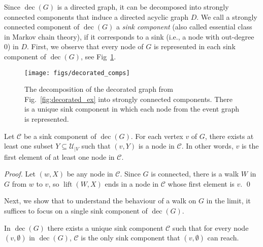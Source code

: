 \documentclass[oribibl,envcountsect,envcountsame]{llncs}
\DeclareMathOperator{\dec}{dec}
\DeclareMathOperator{\lt}{lift}
\newcommand{\C}{\mathcal C}
\newcommand{\U}{\mathcal U}
\begin{document}
Since $\dec(G)$ is a directed graph, it can be decomposed into
strongly connected components that induce a directed acyclic
graph $D$. 
We call a strongly connected component of $\dec(G)$ a \emph{sink 
component} (also called essential class in Markov chain theory), 
if it corresponds to a sink 
(i.e., a node with out-degree $0$) in $D$. 
First, we observe that every node of $G$ is represented in each sink
component of $\dec(G)$, see Fig~\ref{fig:decorated_comps}.

\begin{figure}
\begin{center}
\texttt{[image: figs/decorated\_comps]}
\end{center}
\caption{The decomposition of the decorated graph from 
  Fig.~\ref{fig:decorated_ex} into strongly connected components.
  There is a unique sink component in which each node from the
  event graph is represented.
}
\label{fig:decorated_comps}
\end{figure}


\begin{lemma}\label{lem:all-first-nodes}
Let $\C$ be a sink component of $\dec(G)$.
For each vertex $v$ of $G$, there exists at least one subset $Y \subseteq \U_{|V}$
such that $(v,Y)$ is a node  in $\C$. In other words, $v$ is the first element
of at least one node in $\C$.
\end{lemma}

\begin{proof}
Let $(w, X)$ be any node in $\C$. Since $G$ is connected, 
there is a walk $W$ in $G$ from
$w$ to $v$, so $\lt(W, X)$ ends in a node in $\C$ whose first element is
$v$.
\qed\end{proof}


Next, we show that to understand
the  behaviour of a walk on $G$ in the limit, it
suffices to focus on a single sink component of $\dec(G)$. 


\begin{lemma}\label{lem:uniqueSink}
In $\dec(G)$ there exists a unique sink component $\C$ such that 
for every node $(v, \emptyset)$ in $\dec(G)$, $\C$ is the only
sink component that $(v, \emptyset)$ can reach. 
\end{lemma}
\end{document}
